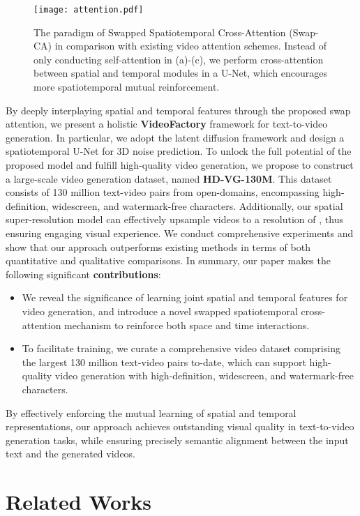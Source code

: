 \documentclass{article}
\begin{document}
\begin{figure}[t]
    \centering
    \texttt{[image: attention.pdf]}
    \caption{The paradigm of Swapped Spatiotemporal Cross-Attention (Swap-CA) in comparison with existing video attention schemes. Instead of only conducting self-attention in (a)-(c), we perform cross-attention between spatial and temporal modules in a U-Net, which encourages more spatiotemporal mutual reinforcement.}
    \label{fig:teaser_attn}
\end{figure}

By deeply interplaying spatial and temporal features through the proposed swap attention, we present a holistic \textbf{VideoFactory} framework for text-to-video generation. In particular, we adopt the latent diffusion framework and design a spatiotemporal U-Net for 3D noise prediction. To unlock the full potential of the proposed model and fulfill high-quality video generation, we propose to construct a large-scale video generation dataset, named \textbf{HD-VG-130M}. This dataset consists of 130 million text-video pairs from open-domains, encompassing high-definition, widescreen, and watermark-free characters. 
Additionally, our spatial super-resolution model can effectively upsample videos to a resolution of , thus ensuring engaging visual experience. We conduct comprehensive experiments and show that our approach outperforms existing methods in terms of both quantitative and qualitative comparisons. In summary, our paper makes the following significant \textbf{contributions}: 
\begin{itemize}[nosep]
    \item We reveal the significance of learning joint spatial and temporal features for video generation, and introduce a novel swapped spatiotemporal cross-attention mechanism to reinforce both space and time interactions. 
    \item To facilitate training, we curate a comprehensive video dataset comprising the largest 130 million text-video pairs to-date, which can support high-quality video generation with high-definition, widescreen, and watermark-free characters.
\end{itemize}
By effectively enforcing the mutual learning of spatial and temporal representations, our approach achieves outstanding visual quality in text-to-video generation tasks, while ensuring precisely semantic alignment between the input text and the generated videos.




\section{Related Works}
\label{sec:related_works}
\end{document}

